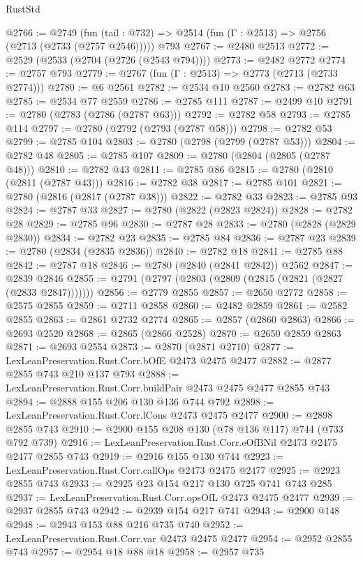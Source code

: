 \begin{lexlean}{RustStd}
\begin{coremodule}
@2766 := @2749
    (fun (tail : @732) => @2514 (fun (Γ : @2513) => @2756 (@2713 (@2733 (@2757 @2546)))))
    @793
@2767 := @2480 @2513
@2772 := @2529 (@2533 (@2704 (@2726 (@2543 @794))))
@2773 := @2482 @2772
@2774 := @2757 @793
@2779 := @2767 (fun (Γ : @2513) => @2773 (@2713 (@2733 @2774)))
@2780 := @6 @2561
@2782 := @2534 @10 @2560
@2783 := @2782 @63
@2785 := @2534 @77 @2559
@2786 := @2785 @111
@2787 := @2499 @10
@2791 := @2780 (@2783 (@2786 (@2787 @63)))
@2792 := @2782 @58
@2793 := @2785 @114
@2797 := @2780 (@2792 (@2793 (@2787 @58)))
@2798 := @2782 @53
@2799 := @2785 @104
@2803 := @2780 (@2798 (@2799 (@2787 @53)))
@2804 := @2782 @48
@2805 := @2785 @107
@2809 := @2780 (@2804 (@2805 (@2787 @48)))
@2810 := @2782 @43
@2811 := @2785 @86
@2815 := @2780 (@2810 (@2811 (@2787 @43)))
@2816 := @2782 @38
@2817 := @2785 @101
@2821 := @2780 (@2816 (@2817 (@2787 @38)))
@2822 := @2782 @33
@2823 := @2785 @93
@2824 := @2787 @33
@2827 := @2780 (@2822 (@2823 @2824))
@2828 := @2782 @28
@2829 := @2785 @96
@2830 := @2787 @28
@2833 := @2780 (@2828 (@2829 @2830))
@2834 := @2782 @23
@2835 := @2785 @84
@2836 := @2787 @23
@2839 := @2780 (@2834 (@2835 @2836))
@2840 := @2782 @18
@2841 := @2785 @88
@2842 := @2787 @18
@2846 := @2780 (@2840 (@2841 @2842)) @2562
@2847 := @2839 @2846
@2855 := @2791 (@2797 (@2803 (@2809 (@2815 (@2821 (@2827 (@2833 @2847)))))))
@2856 := @2779 @2855
@2857 := @2650 @2772
@2858 := @2575 @2855
@2859 := @2711 @2858
@2860 := @2482 @2859
@2861 := @2582 @2855
@2863 := @2861 @2732 @2774
@2865 := @2857 (@2860 @2863)
@2866 := @2693 @2520
@2868 := @2865 (@2866 @2528)
@2870 := @2650 @2859 @2863
@2871 := @2693 @2554
@2873 := @2870 (@2871 @2710)
@2877 := LexLeanPreservation.Rust.Corr.bOfE @2473 @2475 @2477
@2882 := @2877 @2855 @743 @210 @137 @793
@2888 := LexLeanPreservation.Rust.Corr.buildPair @2473 @2475 @2477 @2855 @743
@2894 := @2888 @155 @206 @130 @136 @744 @792
@2898 := LexLeanPreservation.Rust.Corr.lCons @2473 @2475 @2477
@2900 := @2898 @2855 @743
@2910 := @2900 @155 @208 @130 (@78 @136 @117) @744 (@733 @792 @739)
@2916 := LexLeanPreservation.Rust.Corr.eOfBNil @2473 @2475 @2477 @2855 @743
@2919 := @2916 @155 @130 @744
@2923 := LexLeanPreservation.Rust.Corr.callOps @2473 @2475 @2477
@2925 := @2923 @2855 @743
@2933 := @2925 @23 @154 @217 @130 @725 @741 @743 @285
@2937 := LexLeanPreservation.Rust.Corr.opsOfL @2473 @2475 @2477
@2939 := @2937 @2855 @743
@2942 := @2939 @154 @217 @741
@2943 := @2900 @148
@2948 := @2943 @153 @88 @216 @735 @740
@2952 := LexLeanPreservation.Rust.Corr.var @2473 @2475 @2477
@2954 := @2952 @2855 @743
@2957 := @2954 @18 @88 @18
@2958 := @2957 @735

\end{coremodule}
\end{lexlean}
